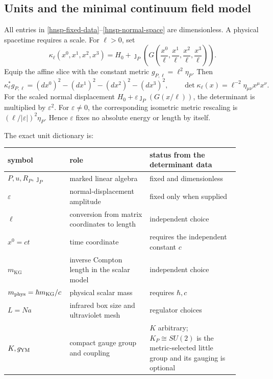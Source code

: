 \subsection{Units and the minimal continuum field model}

All entries in \eqref{hnsp-fixed-data}--\eqref{hnsp-normal-space} are
dimensionless.  A physical spacetime requires a scale.  For \(\ell>0\), set
\begin{equation}
 \kappa_\ell(x^0,x^1,x^2,x^3)
 =H_0+\jmath_P\!\left(
 G\!\left(\frac{x^0}{\ell},\frac{x^1}{\ell},
           \frac{x^2}{\ell},\frac{x^3}{\ell}\right)\right).
 \label{hnsp-dimensional-chart}
\end{equation}
Equip the affine slice with the constant metric \(g_{P,\ell}=\ell^2\eta_P\).
Then
\begin{equation}
 \kappa_\ell^*g_{P,\ell}
 =(dx^0)^2-(dx^1)^2-(dx^2)^2-(dx^3)^2,
 \qquad
 \det\kappa_\ell(x)=\ell^{-2}\eta_{\mu\nu}x^\mu x^\nu.
 \label{hnsp-dimensional-isometry}
\end{equation}
For the scaled normal displacement
\(H_0+\varepsilon\jmath_P(G(x/\ell))\), the determinant is multiplied by
\(\varepsilon^2\).  For \(\varepsilon\ne0\), the corresponding isometric
metric rescaling is \((\ell/|\varepsilon|)^2\eta_P\).  Hence
\(\varepsilon\) fixes no absolute energy or length by itself.

The exact unit dictionary is:
\begin{center}
\begin{tabular}{@{}>{\raggedright\arraybackslash}p{0.18\linewidth}
                    >{\raggedright\arraybackslash}p{0.34\linewidth}
                    >{\raggedright\arraybackslash}p{0.38\linewidth}@{}}
\toprule
symbol & role & status from the determinant data\\
\midrule
\(P,u,R_P,\jmath_P\) & marked linear algebra & fixed and dimensionless\\
\(\varepsilon\) & normal-displacement amplitude & fixed only when supplied\\
\(\ell\) & conversion from matrix coordinates to length & independent choice\\
\(x^0=ct\) & time coordinate & requires the independent constant \(c\)\\
\(m_{\mathrm{KG}}\) & inverse Compton length in the scalar model & independent choice\\
\(m_{\rm phys}=\hbar m_{\mathrm{KG}}/c\) & physical scalar mass & requires \(\hbar,c\)\\
\(L=Na\) & infrared box size and ultraviolet mesh & regulator choices\\
\(K,g_{\rm YM}\) & compact gauge group and coupling & \(K\) arbitrary; \(K_P\cong SU(2)\) is the metric-selected little group and its gauging is optional\\
\bottomrule
\end{tabular}
\end{center}

